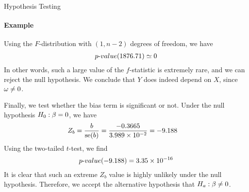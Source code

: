 \begin{frame}{Hypothesis Testing}
\framesubtitle{Example}
%
    Using the $F$-distribution with $(1,n-2)$ degrees of freedom, we
    have
    \begin{align*}
        {p\text{-}value}(1876.71) \simeq 0
    \end{align*}
    In other words, such a large value of the $f$-statistic is extremely
    rare, and we can reject the null hypothesis. We conclude that $Y$
    does indeed depend on $X$, since $\omega\ne 0$.

    Finally, we test whether the bias term is significant or not. Under
    the null hypothesis $H_0: \beta=0$, we have
    \begin{align*}
        Z_{b} & =  \frac{b}{\operatorname{se}(b)} =
    \frac{-0.3665}{3.989 \times 10^{-2}} = -9.188 
    \end{align*}
    Using the two-tailed $t$-test, we find
    \begin{align*}
        {p\text{-}value}(-9.188)  = 3.35 \times 10^{-16}
    \end{align*}
    It is clear that such an extreme $Z_{b}$ value is highly unlikely
    under the null hypothesis. Therefore, we accept the alternative
    hypothesis that $H_a: \beta\ne 0$.
\end{frame}
%
%
